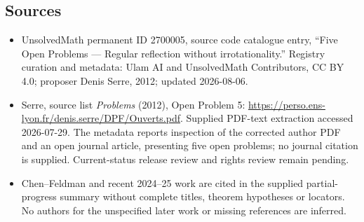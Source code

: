 \documentclass[11pt]{article}
\begin{document}
\subsection{Sources}
\begin{itemize}
\item UnsolvedMath permanent ID 2700005, source code catalogue entry, ``Five Open Problems --- Regular reflection without irrotationality.'' Registry curation and metadata: Ulam AI and UnsolvedMath Contributors, CC BY 4.0; proposer Denis Serre, 2012; updated 2026-08-06.
\item Serre, source list \emph{Problems} (2012), Open Problem 5: \url{https://perso.ens-lyon.fr/denis.serre/DPF/Ouverts.pdf}. Supplied PDF-text extraction accessed 2026-07-29. The metadata reports inspection of the corrected author PDF and an open journal article, presenting five open problems; no journal citation is supplied. Current-status release review and rights review remain pending.
\item Chen--Feldman and recent 2024--25 work are cited in the supplied partial-progress summary without complete titles, theorem hypotheses or locators. No authors for the unspecified later work or missing references are inferred.
\end{itemize}
\end{document}
